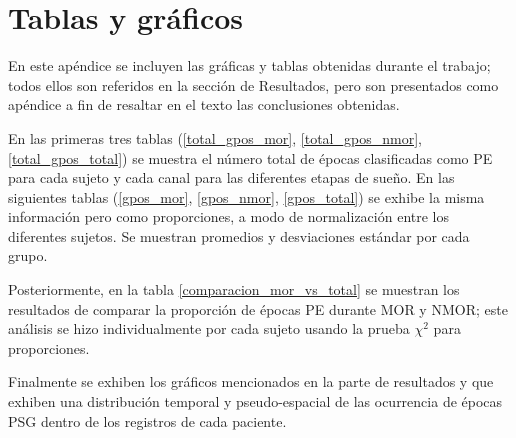 \documentclass[12pt,a4paper]{mitthesis}
\begin{document}

\appendix

\chapter{Tablas y gr\'aficos}

En este ap\'endice se incluyen las gr\'aficas y tablas obtenidas durante el trabajo; todos ellos 
son referidos en la secci\'on de Resultados, pero son presentados como ap\'endice a fin de resaltar 
en el texto las conclusiones obtenidas.

En las primeras tres tablas (\ref{total_gpos_mor}, \ref{total_gpos_nmor}, \ref{total_gpos_total}) 
se muestra el n\'umero total de \'epocas clasificadas como PE para cada sujeto y cada canal para 
las diferentes etapas de sue\~no. En las siguientes tablas (\ref{gpos_mor}, \ref{gpos_nmor}, 
\ref{gpos_total}) se exhibe la misma informaci\'on pero como proporciones, a modo de 
normalizaci\'on entre los diferentes sujetos. Se muestran promedios y desviaciones est\'andar por 
cada grupo.

Posteriormente, en la tabla \ref{comparacion_mor_vs_total} se muestran los resultados de comparar 
la proporci\'on de \'epocas PE durante MOR y NMOR; este an\'alisis se hizo individualmente por cada
sujeto usando la prueba $\chi^{2}$ para proporciones.

Finalmente se exhiben los gr\'aficos mencionados en la parte de resultados y que exhiben una 
distribuci\'on temporal y pseudo-espacial de las ocurrencia de \'epocas PSG dentro de los registros 
de cada paciente. 

\end{document}
